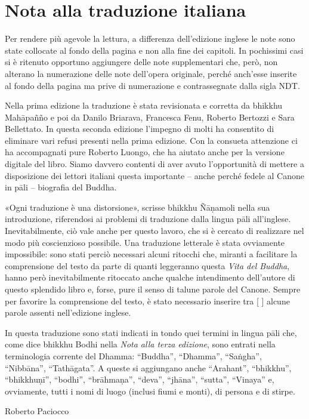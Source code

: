 \chapter{Nota alla traduzione italiana}

Per rendere più agevole la lettura, a differenza dell’edizione inglese
le note sono state collocate al fondo della pagina e non alla fine dei
capitoli. In pochissimi casi si è ritenuto opportuno aggiungere delle
note supplementari che, però, non alterano la numerazione delle note
dell’opera originale, perché anch’esse inserite al fondo della pagina ma
prive di numerazione e contrassegnate dalla sigla NDT.

Nella prima edizione la traduzione è stata
revisionata e corretta da bhikkhu Mahāpañño e poi da Danilo Briarava,
Francesca Fenu, Roberto Bertozzi e Sara Bellettato. In questa seconda edizione
l’impegno di molti ha consentito di eliminare vari refusi presenti nella prima
edizione. Con la consueta attenzione ci ha accompagnati pure Roberto Luongo,
che ha aiutato anche per la versione digitale del libro. Siamo davvero contenti
di aver avuto l’opportunità di mettere a disposizione dei lettori italiani questa
importante – anche perché fedele al Canone in pāli – biografia del Buddha.

«Ogni traduzione è una distorsione», scrisse bhikkhu Ñāṇamoli nella sua
introduzione, riferendosi ai problemi di traduzione dalla lingua pāli
all’inglese. Inevitabilmente, ciò vale anche per questo lavoro, che si è
cercato di realizzare nel modo più coscienzioso possibile. Una
traduzione letterale è stata ovviamente impossibile: sono stati perciò
necessari alcuni ritocchi che, miranti a facilitare la comprensione
del testo da parte di quanti leggeranno questa \emph{Vita del Buddha}, hanno
però inevitabilmente ritoccato anche qualche intendimento dell’autore di
questo splendido libro e, forse, pure il senso di talune parole del
Canone. Sempre per favorire la comprensione del testo, è stato
necessario inserire tra [ ] alcune parole assenti nell’edizione inglese.

In questa traduzione sono stati indicati in tondo quei termini in lingua
pāli che, come dice bhikkhu Bodhi nella \emph{Nota alla terza edizione}, sono
entrati nella terminologia corrente del Dhamma: “Buddha”, “Dhamma”,
“Saṅgha”, “Nibbāna”, “Tathāgata”. A queste si aggiungano anche
“Arahant”, “bhikkhu”, “bhikkhuṇī”, “bodhi”, “brāhmaṇa”, “deva”, “jhāna”,
“sutta”, “Vinaya” e, ovviamente, tutti i nomi di luogo (inclusi fiumi e
monti), di persona e di stirpe.

\bigskip

{\raggedleft
Roberto Paciocco
\par}

